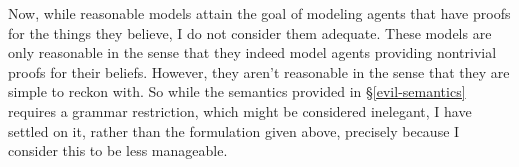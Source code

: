 Now, while reasonable models attain the goal of modeling agents that have
proofs for the things they believe, I do not consider them adequate. These models are only reasonable in the
sense that they indeed model agents providing nontrivial proofs for their beliefs.
However, they aren't reasonable in the sense that they are simple
to reckon with.   So while the semantics provided in \S\ref{evil-semantics} requires a grammar
restriction, which might be considered inelegant, I have settled on it, rather than the formulation given above, precisely because I consider this to be less manageable.